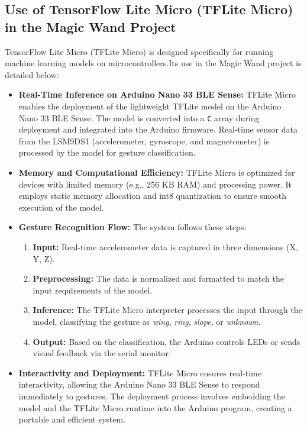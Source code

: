 \subsection{Use of TensorFlow Lite Micro (TFLite Micro) in the Magic Wand Project}
TensorFlow Lite Micro (TFLite Micro) is designed specifically for running machine learning models on microcontrollers.Its use in the Magic Wand project is detailed below:

\begin{itemize}
	\item \textbf{Real-Time Inference on Arduino Nano 33 BLE Sense:}
	TFLite Micro enables the deployment of the lightweight TFLite model on the Arduino Nano 33 BLE Sense. The model is converted into a \texttt{C} array during deployment and integrated into the Arduino firmware. Real-time sensor data from the LSM9DS1 (accelerometer, gyroscope, and magnetometer) is processed by the model for gesture classification.
	
	\item \textbf{Memory and Computational Efficiency:}
	TFLite Micro is optimized for devices with limited memory (e.g., 256 KB RAM) and processing power. It employs static memory allocation and int8 quantization to ensure smooth execution of the model.
	
	\item \textbf{Gesture Recognition Flow:}
	The system follows these steps:
	\begin{enumerate}
		\item \textbf{Input:} Real-time accelerometer data is captured in three dimensions (X, Y, Z).
		\item \textbf{Preprocessing:} The data is normalized and formatted to match the input requirements of the model.
		\item \textbf{Inference:} The TFLite Micro interpreter processes the input through the model, classifying the gesture as \textit{wing}, \textit{ring}, \textit{slope}, or \textit{unknown}.
		\item \textbf{Output:} Based on the classification, the Arduino controls LEDs or sends visual feedback via the serial monitor.
	\end{enumerate}
	
	\item \textbf{Interactivity and Deployment:}
	TFLite Micro ensures real-time interactivity, allowing the Arduino Nano 33 BLE Sense to respond immediately to gestures. The deployment process involves embedding the model and the TFLite Micro runtime into the Arduino program, creating a portable and efficient system.
\end{itemize}

